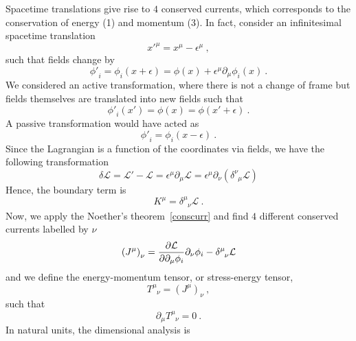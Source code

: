     Spacetime translations give rise to $4$ conserved currents, which corresponds to the conservation of energy (1) and momentum (3). In fact, consider an infinitesimal spacetime translation 
    \begin{equation*}
        {x'}^\mu = x^\mu - \epsilon^\mu ~,
    \end{equation*}
    such that fields change by 
    \begin{equation*}
        {\phi'}_i = \phi_i (x + \epsilon) = \phi(x) + \epsilon^\mu \partial_\mu \phi_i (x) ~.
    \end{equation*}
    We considered an active transformation, where there is not a change of frame but fields themselves are translated into new fields such that 
    \begin{equation*}
        {\phi'}_i (x') = \phi(x) = \phi(x' + \epsilon) ~.
    \end{equation*}
    A passive transformation would have acted as 
    \begin{equation*}
        {\phi'}_i = \phi_i (x - \epsilon)  ~.
    \end{equation*}
    Since the Lagrangian is a function of the coordinates via fields, we have the following transformation
    \begin{equation*}
        \delta \mathcal L = \mathcal L' - \mathcal L = \epsilon^\mu \partial_\mu \mathcal L = \epsilon^\mu \partial_\nu(\delta^\nu_{\phantom \nu \mu} \mathcal L)
    \end{equation*}
    Hence, the boundary term is 
    \begin{equation*}
        K^\mu = \delta^\mu_{\phantom \mu \nu} \mathcal L ~.
    \end{equation*}
    Now, we apply the Noether's theorem~\eqref{conscurr} and find $4$ different conserved currents labelled by $\nu$
    \begin{equation*}
        {(J^\mu)}_\nu = \pdv{\mathcal L}{\partial_\mu \phi_i} \partial_\nu \phi_i - \delta^\mu_{\phantom \mu \nu} \mathcal L
    \end{equation*}
    and we define the energy-momentum tensor, or stress-energy tensor, 
    \begin{equation*}\label{emten}
        T^\mu_{\phantom \mu \nu} = {(J^\mu)}_\nu ~,
    \end{equation*}
    such that 
    \begin{equation*}
        \partial_\mu T^\mu_{\phantom \mu \nu} = 0 ~.
    \end{equation*}
    In natural units, the dimensional analysis is 
